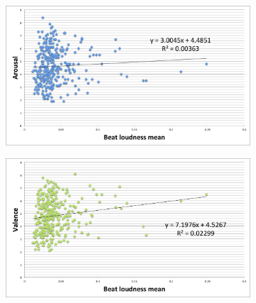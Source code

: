 \begin{figure}
         \centering
        \begin{subfigure}[b]{0.48\textwidth}
                \includegraphics[width=\textwidth]{Figures/beatloudnessmean-arousal}
			   \vspace{20pt}
        \end{subfigure}
        \begin{subfigure}[b]{0.48\textwidth}
                \includegraphics[width=\textwidth]{Figures/beatloudnessmean-valence}
                  \vspace{20pt}
        \end{subfigure}
        

\end{figure}
